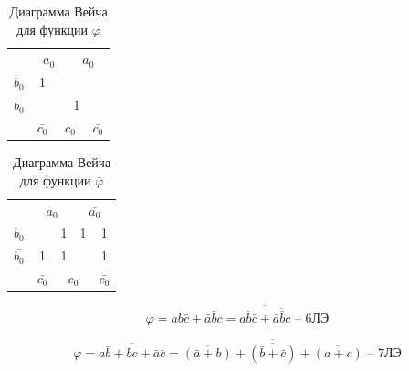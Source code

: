 \documentclass[a4paper,14pt]{article}
\begin{document}
\begin{table}[H]
	\begin{center}
		\caption{\label{tab:perSet_force} Диаграмма Вейча для функции  $\varphi$}
		
		\begin{tabular}{ccccc}
			& \multicolumn{2}{c}{$a_0$}                      & \multicolumn{2}{c}{$a_0$}                      \\ \cline{2-5} 
			\multicolumn{1}{c|}{$b_0$} & \multicolumn{1}{c|}{1} & \multicolumn{1}{c|}{} & \multicolumn{1}{c|}{}  & \multicolumn{1}{c|}{} \\ \cline{2-5} 
			\multicolumn{1}{c|}{$b_0$} & \multicolumn{1}{c|}{}  & \multicolumn{1}{c|}{} & \multicolumn{1}{c|}{1} & \multicolumn{1}{c|}{} \\ \cline{2-5} 
			& $\bar{c_0}$            & \multicolumn{2}{c}{$c_0$}                      & $\bar{c_0}$          
		\end{tabular}
	\end{center}
\end{table}

\begin{table}[H]
	\begin{center}
		\caption{\label{tab:perSet_ve} Диаграмма Вейча для функции  $\bar{\varphi}$}
		
		\begin{tabular}{ccccc}
			& \multicolumn{2}{c}{$a_0$}                           & \multicolumn{2}{c}{$\bar{a_0}$}                          \\ \cline{2-5} 
			\multicolumn{1}{c|}{$b_0$}  & \multicolumn{1}{c|}{}  & \multicolumn{1}{c|}{1} & \multicolumn{1}{c|}{1} & \multicolumn{1}{c|}{1} \\ \cline{2-5} 
			\multicolumn{1}{c|}{$\bar{b_0}$} & \multicolumn{1}{c|}{1} & \multicolumn{1}{c|}{1} & \multicolumn{1}{c|}{}  & \multicolumn{1}{c|}{1} \\ \cline{2-5} 
			& $\bar{c_0}$                    & \multicolumn{2}{c}{$c_0$}                           & $\bar{c_0}$                   
		\end{tabular}
	\end{center}
\end{table}

$$\varphi = ab\bar{c} + \bar{a}\bar{b}c =\overline{ \overline{ab\bar{c}} + \overline{\bar{a}\bar{b}c}} \text{ --  6ЛЭ}$$

$$\varphi = \overline{a\bar{b} + bc + \bar{a}\bar{c}} =  \overline{\overline{(\bar{a} + b)} +\overline{(\bar{b} + \bar{c})} + \overline{(a + c)}} \text{ --  7ЛЭ}$$
\end{document}
